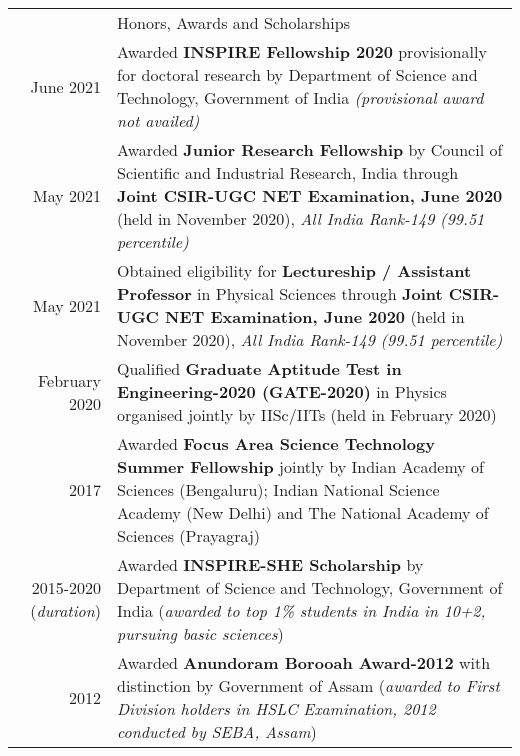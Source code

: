 \documentclass[a4paper, 11pt]{article}
\newcommand{\headingfont}{\Large\color{Peach}}
\newenvironment{SectionTable}[1]{
	\renewcommand*{\arraystretch}{1.7}
	\setlength{\tabcolsep}{10pt}
	\begin{longtable}{Rp{5.2in}} & #1 \\}
{\end{longtable}\vspace{-.3cm}}
\begin{document}
\begin{SectionTable}{\headingfont Honors, Awards and Scholarships}
June 2021 & 
Awarded \textbf{INSPIRE Fellowship 2020} provisionally for doctoral research by Department of Science and Technology, Government of India \textit{(provisional award not availed)}
 \\

May 2021 &
Awarded \textbf{Junior Research Fellowship} by Council of Scientific and
Industrial Research, India through \textbf{Joint CSIR-UGC NET Examination, June 2020}
(held in November 2020), \textit{All India Rank-149 (99.51 percentile)} \\

May 2021 &
Obtained eligibility for \textbf{Lectureship / Assistant Professor} in Physical Sciences through \textbf{Joint CSIR-UGC NET Examination, June 2020}
(held in November 2020), \textit{All India Rank-149 (99.51 percentile)} \\

February 2020 &
Qualified \textbf{Graduate Aptitude Test in Engineering-2020 (GATE-2020)} in Physics organised jointly by IISc/IITs (held in February 2020) \\

2017 &
Awarded \textbf{Focus Area Science Technology Summer Fellowship} jointly by Indian Academy of Sciences (Bengaluru); Indian National Science Academy (New Delhi) and The National Academy of Sciences (Prayagraj) \\

2015-2020 (\textit{duration})&
Awarded \textbf{INSPIRE-SHE Scholarship} by Department of Science and Technology, Government of India (\textit{awarded to top 1\% students in India in 10+2, pursuing basic sciences}) \\

2012 &
Awarded \textbf{Anundoram Borooah Award-2012} with distinction by Government of Assam (\textit{awarded to First Division holders in HSLC Examination, 2012 conducted by SEBA, Assam})

\end{SectionTable}










\end{document}
